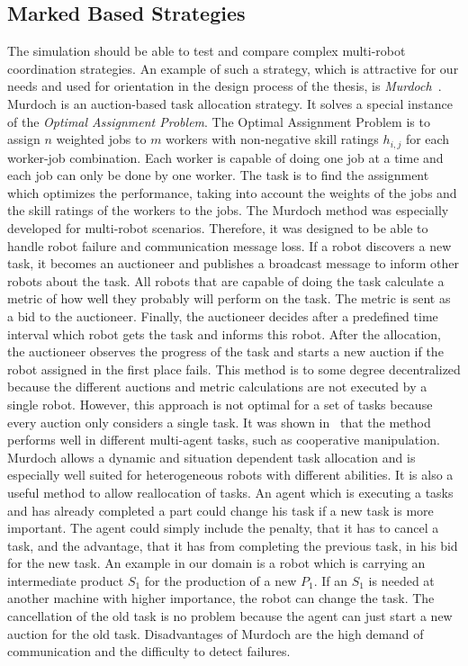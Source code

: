 \subsection{Marked Based Strategies}
The simulation should be able to test and compare complex multi-robot coordination strategies. An example of such a strategy, which is attractive for our needs and used for orientation in the design process of the thesis, is \textit{Murdoch}~\cite{DissMurdoch}. Murdoch is an auction-based task allocation strategy. It solves a special instance of the \textit{Optimal Assignment Problem}. The Optimal Assignment Problem is to assign $n$ weighted jobs to $m$ workers with non-negative skill ratings $h_{i,j}$ for each worker-job combination. Each worker is capable of doing one job at a time and each job can only be done by one worker. The task is to find the assignment which optimizes the performance, taking into account the weights of the jobs and the skill ratings of the workers to the jobs. The Murdoch method was especially developed 
for multi-robot scenarios. Therefore, it was designed to be able to handle robot failure and communication message loss. If a robot discovers a new task, it becomes an auctioneer and publishes a broadcast message to inform other robots about the task. All robots that are capable of doing the task calculate a metric of how well they probably will perform on the task. The metric is sent as a bid to the auctioneer. Finally, the auctioneer decides after a predefined time interval which robot gets the task and informs this robot. After the allocation, the auctioneer observes the progress of the task and starts a new auction if the robot assigned in the first place fails. This method is to some degree decentralized because the different auctions and metric calculations are not executed by a single robot. However, this approach is not optimal for a set of tasks because every auction only considers a single task. It was shown in~\cite{DissMurdoch} that the method performs well in different multi-agent tasks, such as cooperative manipulation.\\
Murdoch allows a dynamic and situation dependent task allocation and is especially well suited for heterogeneous robots with different abilities. It is also a useful method to allow reallocation of tasks. An agent which is executing a tasks and has already completed a part could change his task if a new task is more important. The agent could simply include the penalty, that it has to cancel a task, and the advantage, that it has from completing the previous task, in his bid for the new task. An example in our domain is a robot which is carrying an intermediate product $S_1$ for the production of a new $P_1$. If an $S_1$ is needed at another machine with higher importance, the robot can change the task. The cancellation of the old task is no problem because the agent can just start a new auction for the old task. Disadvantages of Murdoch are the high demand of communication and the difficulty to detect failures.
